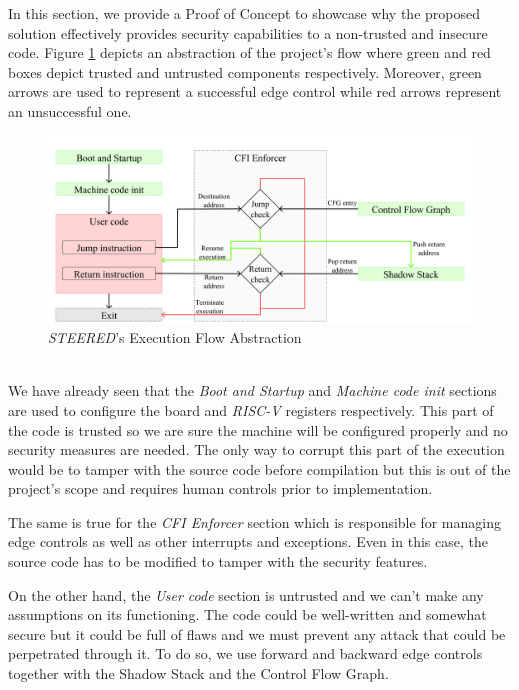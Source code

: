 In this section, we provide a Proof of Concept to showcase why the proposed
solution effectively provides security capabilities to a non-trusted and
insecure code. Figure \ref{fig:functioning} depicts an abstraction of the project's
flow where green and red boxes depict trusted and untrusted components respectively.
Moreover, green arrows are used to represent a successful edge control while red
arrows represent an unsuccessful one. \\
\begin{figure}[htbp]
  \centering
  \includegraphics[width=.9\linewidth]{images/functioning.png}
  \caption{\textit{STEERED}'s Execution Flow Abstraction}
  \label{fig:functioning}
\end{figure}
\\

We have already seen that the \textit{Boot and Startup} and \textit{Machine code
init} sections are used to configure the board and \textit{RISC-V} registers
respectively. This part of the code is trusted so we are sure the machine will be
configured properly and no security measures are needed. The only way to corrupt
this part of the execution would be to tamper with the source code before
compilation but this is out of the project's scope and requires human controls
prior to implementation.

The same is true for the \textit{CFI Enforcer} section which is responsible for managing
edge controls as well as other interrupts and exceptions. Even in this case, the
source code has to be modified to tamper with the security features.

On the other hand, the \textit{User code} section is untrusted and we can't make
any assumptions on its functioning. The code could be well-written and somewhat
secure but it could be full of flaws and we must prevent any attack that could
be perpetrated through it. To do so, we use forward and backward edge controls
together with the Shadow Stack and the Control Flow Graph.

